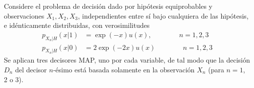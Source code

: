 \ifspanish

\question[25] %

Considere el problema de decisión dado por hipótesis equiprobables y observaciones $X_1,X_2,X_3$, independientes entre sí bajo cualquiera de las hipótesis, e idénticamente distribuidas, con verosimilitudes
\begin{align}
p_{X_n|H}(x|1) &= \exp(- x) u(x)       , \qquad  \qquad n=1,2,3 \nonumber\\
p_{X_n|H}(x|0) &= 2 \exp(- 2 x) u(x)   \qquad  \qquad n=1,2,3 \nonumber 
\end{align}
Se aplican tres decisores MAP, uno por cada variable, de tal modo que la decisión $D_n$ del decisor $n$-ésimo está basada solamente en la observación $X_n$ (para $n=1$, 2 o 3).


\begin{solution}
\end{solution}

